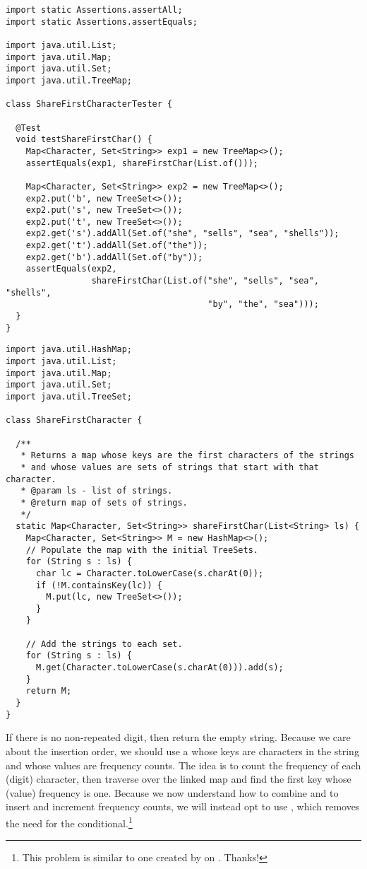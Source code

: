 \begin{lstlisting}[language=MyJava]
import static Assertions.assertAll;
import static Assertions.assertEquals;

import java.util.List;
import java.util.Map;
import java.util.Set;
import java.util.TreeMap;

class ShareFirstCharacterTester {
  
  @Test
  void testShareFirstChar() {
    Map<Character, Set<String>> exp1 = new TreeMap<>();
    assertEquals(exp1, shareFirstChar(List.of()));

    Map<Character, Set<String>> exp2 = new TreeMap<>();
    exp2.put('b', new TreeSet<>());
    exp2.put('s', new TreeSet<>());
    exp2.put('t', new TreeSet<>());
    exp2.get('s').addAll(Set.of("she", "sells", "sea", "shells"));
    exp2.get('t').addAll(Set.of("the"));
    exp2.get('b').addAll(Set.of("by"));
    assertEquals(exp2, 
                 shareFirstChar(List.of("she", "sells", "sea", "shells", 
                                        "by", "the", "sea")));
  }
}
\end{lstlisting}

\begin{lstlisting}[language=MyJava]
import java.util.HashMap;
import java.util.List;
import java.util.Map;
import java.util.Set;
import java.util.TreeSet;

class ShareFirstCharacter {

  /**
   * Returns a map whose keys are the first characters of the strings
   * and whose values are sets of strings that start with that character.
   * @param ls - list of strings.
   * @return map of sets of strings.
   */
  static Map<Character, Set<String>> shareFirstChar(List<String> ls) {
    Map<Character, Set<String>> M = new HashMap<>();
    // Populate the map with the initial TreeSets.
    for (String s : ls) {
      char lc = Character.toLowerCase(s.charAt(0));
      if (!M.containsKey(lc)) {
        M.put(lc, new TreeSet<>());
      }
    }

    // Add the strings to each set.
    for (String s : ls) {
      M.get(Character.toLowerCase(s.charAt(0))).add(s);
    }
    return M;
  }
}
\end{lstlisting}

If there is no non-repeated digit, then return the empty string. 
Because we care about the insertion order, we should use a  whose keys are characters in the string and whose values are frequency counts. 
The idea is to count the frequency of each (digit) character, then traverse over the linked map and find the first key whose (value) frequency is one. 
Because we now understand how to combine  and  to insert and increment frequency counts, we will instead opt to use , which removes the need for the conditional.\footnote{This problem is similar to one created by  on . Thanks!}



